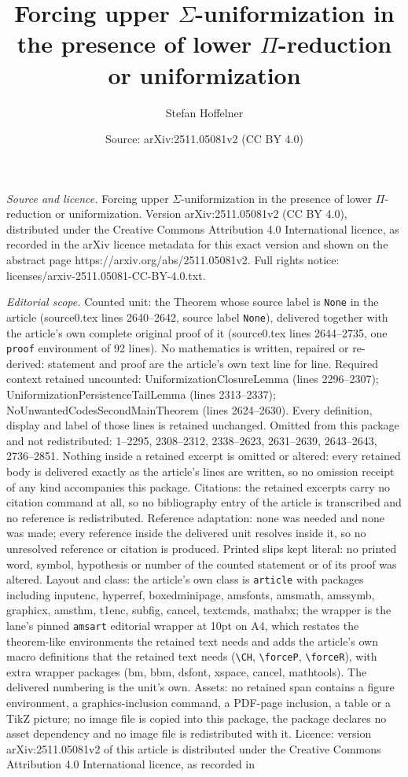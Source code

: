 \documentclass[10pt,a4paper]{amsart}
\title[Forcing upper $\Sigma$-uniformization in the presence of low]{Forcing upper $\Sigma$-uniformization in the presence of lower $\Pi$-reduction or uniformization}
\author{Stefan Hoffelner}
\date{Source: arXiv:2511.05081v2 (CC BY 4.0)}
\begin{document}
\maketitle

\noindent\emph{Source and licence.} Forcing upper $\Sigma$-uniformization in the presence of lower $\Pi$-reduction or uniformization. Version arXiv:2511.05081v2 (CC BY 4.0), distributed under the Creative Commons Attribution 4.0 International licence, as recorded in the arXiv licence metadata for this exact version and shown on the abstract page https://arxiv.org/abs/2511.05081v2. Full rights notice: licenses/arxiv-2511.05081-CC-BY-4.0.txt.\par\smallskip

\noindent\textit{Editorial scope.} Counted unit: the Theorem whose source label is \texttt{None} in the article (source0.tex lines 2640--2642, source label \texttt{None}), delivered together with the article's own complete original proof of it (source0.tex lines 2644--2735, one \texttt{proof} environment of 92 lines). No mathematics is written, repaired or re-derived: statement and proof are the article's own text line for line. Required context retained uncounted: UniformizationClosureLemma (lines 2296--2307); UniformizationPersistenceTailLemma (lines 2313--2337); NoUnwantedCodesSecondMainTheorem (lines 2624--2630). Every definition, display and label of those lines is retained unchanged. Omitted from this package and not redistributed: 1--2295, 2308--2312, 2338--2623, 2631--2639, 2643--2643, 2736--2851. Nothing inside a retained excerpt is omitted or altered: every retained body is delivered exactly as the article's lines are written, so no omission receipt of any kind accompanies this package. Citations: the retained excerpts carry no citation command at all, so no bibliography entry of the article is transcribed and no reference is redistributed. Reference adaptation: none was needed and none was made; every reference inside the delivered unit resolves inside it, so no unresolved reference or citation is produced. Printed slips kept literal: no printed word, symbol, hypothesis or number of the counted statement or of its proof was altered. Layout and class: the article's own class is \texttt{article} with packages including inputenc, hyperref, boxedminipage, amsfonts, amsmath, amssymb, graphicx, amsthm, t1enc, subfig, cancel, textcmds, mathabx; the wrapper is the lane's pinned \texttt{amsart} editorial wrapper at 10pt on A4, which restates the theorem-like environments the retained text needs and adds the article's own macro definitions that the retained text needs (\texttt{\textbackslash CH}, \texttt{\textbackslash forceP}, \texttt{\textbackslash forceR}), with extra wrapper packages (bm, bbm, dsfont, xspace, cancel, mathtools). The delivered numbering is the unit's own. Assets: no retained span contains a figure environment, a graphics-inclusion command, a PDF-page inclusion, a table or a TikZ picture; no image file is copied into this package, the package declares no asset dependency and no image file is redistributed with it. Licence: version arXiv:2511.05081v2 of this article is distributed under the Creative Commons Attribution 4.0 International licence, as recorded in 
\end{document}

